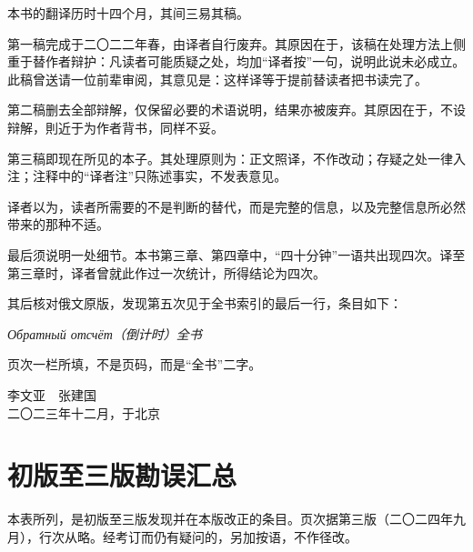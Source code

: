 \noindent
本书的翻译历时十四个月，其间三易其稿。

第一稿完成于二〇二二年春，由译者自行废弃。其原因在于，该稿在处理方法上侧重于替作者辩护：凡读者可能质疑之处，均加“译者按”一句，说明此说未必成立。此稿曾送请一位前辈审阅，其意见是：这样译等于提前替读者把书读完了。

第二稿删去全部辩解，仅保留必要的术语说明，结果亦被废弃。其原因在于，不设辩解，則近于为作者背书，同样不妥。

第三稿即现在所见的本子。其处理原则为：正文照译，不作改动；存疑之处一律入注；注释中的“译者注”只陈述事实，不发表意见。

译者以为，读者所需要的不是判断的替代，而是完整的信息，以及完整信息所必然带来的那种不适。

最后须说明一处细节。本书第三章、第四章中，“四十分钟”一语共出现四次。译至第三章时，译者曾就此作过一次统计，所得结论为四次。

其后核对俄文原版，发现第五次见于全书索引的最后一行，条目如下：

\vspace{2mm}
\begin{center}
{\small\itshape Обратный отсчёт（倒计时）\dotfill 全书}
\end{center}
\vspace{2mm}

页次一栏所填，不是页码，而是“全书”二字。

\vspace{8mm}
\begin{flushright}
{\small 李文亚\ \ 张建国}\\[2pt]
{\footnotesize\color{pencil} 二〇二三年十二月，于北京}
\end{flushright}

\clearpage
\chapter*{初版至三版勘误汇总}

\noindent
本表所列，是初版至三版发现并在本版改正的条目。页次据第三版（二〇二四年九月），行次从略。经考订而仍有疑问的，另加按语，不作径改。


